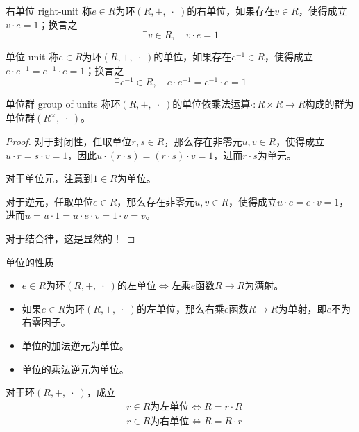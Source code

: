\begin{definition}{右单位 right-unit}
	称$e\in R$为环$(R,+,\;\cdot\;)$的右单位，如果存在$v\in R$，使得成立$v\cdot e=1$；换言之
	$$
	\exists v\in R,\quad v\cdot e=1
	$$
\end{definition}

\begin{definition}{单位 unit}
	称$e\in R$为环$(R,+,\;\cdot\;)$的单位，如果存在$e^{-1}\in R$，使得成立$e\cdot e^{-1}=e^{-1}\cdot e=1$；换言之
	$$
	\exists e^{-1}\in R,\quad e\cdot e^{-1}=e^{-1}\cdot e=1
	$$
\end{definition}

\begin{definition}{单位群 group of units}
	称环$(R,+,\;\cdot\;)$的单位依乘法运算$\cdot:R\times R\to R$构成的群为单位群$(R^{\times},\;\cdot\;)$。
\end{definition}

\begin{proof}
	对于封闭性，任取单位$r,s\in R$，那么存在非零元$u,v\in R$，使得成立$u\cdot r=s\cdot v=1$，因此$u\cdot (r\cdot s)=(r\cdot s)\cdot v=1$，进而$r\cdot s$为单元。
	
	对于单位元，注意到$1\in R$为单位。
	
	对于逆元，任取单位$e\in R$，那么存在非零元$u,v\in R$，使得成立$u\cdot e=e\cdot v=1$，进而$u=u\cdot 1=u\cdot e\cdot v=1\cdot v=v$。
	
	对于结合律，这是显然的！
\end{proof}

\begin{definition}{单位的性质}
	\begin{itemize}
		\item $e\in R$为环$(R,+,\;\cdot\;)$的左单位$\iff$左乘$e$函数$R\to R$为满射。
		\item 如果$e\in R$为环$(R,+,\;\cdot\;)$的左单位，那么右乘$e$函数$R\to R$为单射，即$e$不为右零因子。
		\item 单位的加法逆元为单位。
		\item 单位的乘法逆元为单位。
	\end{itemize}
\end{definition}

\begin{proposition}
	对于环$(R,+,\;\cdot\;)$，成立
	\begin{align*}
		&r\in R\text{为左单位}\iff R=r\cdot R\\
		&r\in R\text{为右单位}\iff R=R\cdot r
	\end{align*}
\end{proposition}

